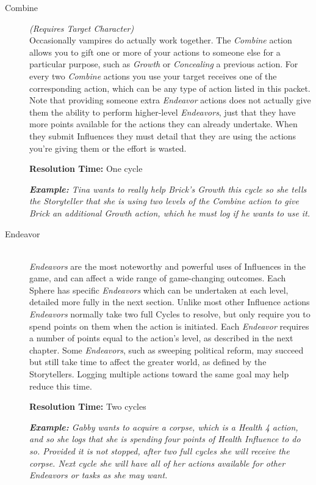 \begin{description}
	\item[Combine] \emph{(Requires Target Character)} \hfill \\
		Occasionally vampires do actually work together.  The \emph{Combine} action allows you to 
		gift one or more of your actions to someone else for a particular purpose, such as \emph{Growth} 
		or \emph{Concealing} a previous action.  For every two \emph{Combine} actions you use your target 
		receives one of the corresponding action, which can be any type of action listed in this packet.  
		Note that providing someone extra \emph{Endeavor} actions does not actually give them the ability to 
		perform higher-level \emph{Endeavors}, just that they have more points available for the actions they 
		can already undertake. 	When they submit Influences they must detail that they are using the actions 
		you're giving them or the effort is wasted.
				
		\textbf{Resolution Time:} One cycle
		
		\emph{\textbf{Example:}  Tina wants to really help Brick's \emph{Growth} this cycle so she tells the 
		Storyteller that she is using two levels of the \emph{Combine} action to give Brick an additional 
		\emph{Growth} action, which he must log if he wants to use it.} \\
		
	\item[Endeavor] \hfill \\
		\emph{Endeavors} are the most noteworthy and powerful uses of Influences in the game, and can affect 
		a wide range of game-changing outcomes.  Each Sphere has specific \emph{Endeavors} which can be 
		undertaken at each level, detailed more fully in the next section.  Unlike most other Influence actions 
		\emph{Endeavors} normally take two full Cycles to resolve, but only require you to spend points on them 
		when the action is initiated.  Each \emph{Endeavor} requires a number of points equal to the action's 
		level, as described in the next chapter.  Some \emph{Endeavors}, such as sweeping political reform, may 
		succeed but still take time to affect the greater world, as defined by the Storytellers.  Logging multiple 
		actions toward the same goal may help reduce this time.

		\textbf{Resolution Time:} Two cycles
		
		\emph{\textbf{Example:} Gabby wants to acquire a corpse, which is a \emph{Health 4} action, and so she 
		logs that she is spending four points of \emph{Health} Influence to do so. Provided it is not stopped, 
		after two full cycles she will receive the corpse. Next cycle she will have all of her actions available for 
		other \emph{Endeavors} or tasks as she may want.} \\
		

\end{description}
